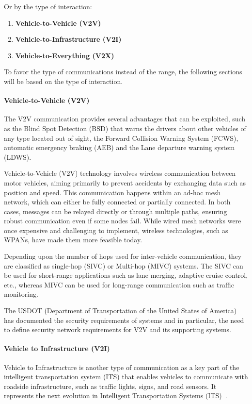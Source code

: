 Or by the type of interaction:
\begin{enumerate}
    \item \textbf{Vehicle-to-Vehicle (V2V)}
    \item \textbf{Vehicle-to-Infrastructure (V2I)}
    \item \textbf{Vehicle-to-Everything (V2X)}
\end{enumerate}

To favor the type of communications instead of the range, the following sections will be based on the type of interaction.

\paragraph{Vehicle-to-Vehicle (V2V)}

The V2V communication provides several advantages that can be exploited, such as the Blind Spot Detection (BSD) that warns the drivers about other vehicles of any type located out of sight,
the Forward Collision Warning System (FCWS), automatic emergency braking (AEB) and the Lane departure warning system (LDWS)\cite{arena2019overview}.

Vehicle-to-Vehicle (V2V) technology involves wireless communication between motor vehicles, aiming primarily to prevent accidents by exchanging data such as position and speed.
This communication happens within an ad-hoc mesh network, which can either be fully connected or partially connected.
In both cases, messages can be relayed directly or through multiple paths, ensuring robust communication even if some nodes fail.
While wired mesh networks were once expensive and challenging to implement, wireless technologies, such as WPANs, have made them more feasible today\cite{arena2019overview}.

Depending upon the number of hops used for inter-vehicle communication, they are classified as single-hop (SIVC) or
Multi-hop (MIVC) systems.
The SIVC can be used for short-range applications such as
lane merging, adaptive cruise control, etc., whereas MIVC can be used for long-range communication such as traffic monitoring\cite{zheng2020cooperative}.

The USDOT (Department of Transportation of the United States of America) has documented the security requirements of
systems and in particular, the need to define security network requirements for V2V and its supporting systems.

\paragraph{Vehicle to Infrastructure (V2I)}
Vehicle to Infrastructure is another type of communication as a key part of the intelligent transportation system (ITS)
that enables vehicles to communicate with roadside infrastructure, such as traffic lights, signs, and road sensors.
It represents the next evolution in Intelligent Transportation Systems (ITS)~\cite{dot2024v2i}.

